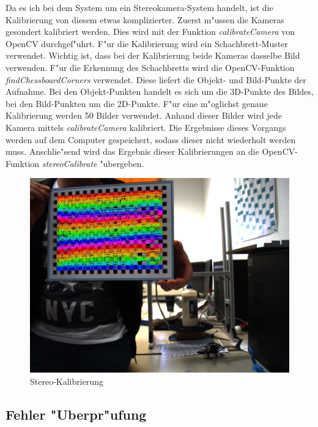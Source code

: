 \noindent Da es ich bei dem System um ein Stereokamera-System handelt, ist die Kalibrierung von diesem etwas komplizierter.\newline
Zuerst m"ussen die Kameras gesondert kalibriert werden. Dies wird mit der Funktion \textit{calibrateCamera} von OpenCV durchgef"uhrt. F"ur die Kalibrierung wird ein Schachbrett-Muster verwendet. Wichtig ist, dass bei der Kalibrierung beide Kameras dasselbe Bild verwenden. F"ur die Erkennung des Schachbretts wird die OpenCV-Funktion \textit{findChessboardCorners} verwendet. Diese liefert die Objekt- und Bild-Punkte der Aufnahme. Bei den Objekt-Punkten handelt es sich um die 3D-Punkte des Bildes, bei den Bild-Punkten um die 2D-Punkte\cite{OcvD}.
\noindent F"ur eine m"oglichst genaue Kalibrierung werden 50 Bilder verwendet. Anhand dieser Bilder wird jede Kamera mittels \textit{calibrateCamera} kalibriert.\newline
Die Ergebnisse dieses Vorgangs werden auf dem Computer gespeichert, sodass dieser nicht wiederholt werden muss.\newline
Anschlie"send wird das Ergebnis dieser Kalibrierungen an die OpenCV-Funktion \textit{stereoCalibrate} "ubergeben.


\begin{figure}[H]
	\includegraphics[scale=0.4]{bilder/calibration}
	\caption[Stereo-Kalibrierung]{Stereo-Kalibrierung}
\end{figure}

\subsection{Fehler "Uberpr"ufung}
\label{sec:fehlertest}